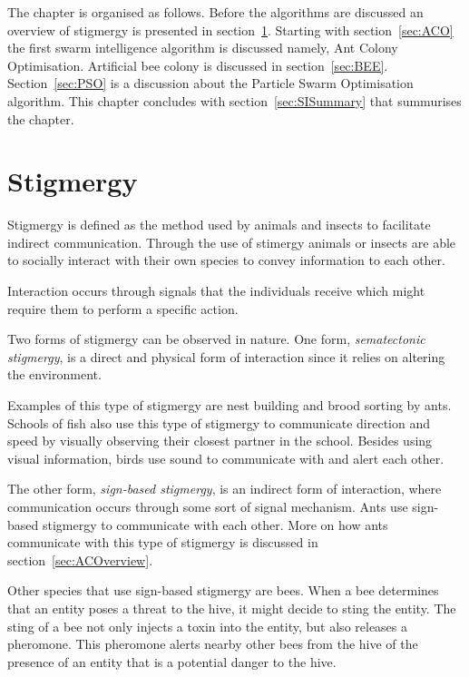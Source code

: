 The chapter is organised as follows. Before the algorithms are discussed an overview of stigmergy is presented in section~\ref{sec:stigmergy}. Starting with section~\ref{sec:ACO} the first swarm intelligence algorithm is discussed namely, Ant Colony Optimisation. Artificial bee colony is discussed in section~\ref{sec:BEE}. Section~\ref{sec:PSO} is a discussion about the Particle Swarm Optimisation algorithm. This chapter concludes with section~\ref{sec:SISummary} that summurises the chapter.

\section{Stigmergy}
\label{sec:stigmergy}
Stigmergy is defined as the method used by animals and insects to facilitate indirect communication\cite{AntsAndStigmergy,CompuIntelligenceIntro,AntIntroTrends,FundamentalSwarm}. Through the use of stimergy animals or insects are able to socially interact with their own species to convey information to each other\cite{AntsAndStigmergy,CompuIntelligenceIntro,AntIntroTrends,FundamentalSwarm}.

Interaction occurs through signals that the individuals receive which might require them to perform a specific action\cite{AntsAndStigmergy,CompuIntelligenceIntro,AntIntroTrends}.

Two forms of stigmergy can be observed in nature. One form, \emph{sematectonic stigmergy}\label{def:sematectonic}, is a direct and physical form of interaction since it relies on altering the environment\cite{CompuIntelligenceIntro}. 

Examples of this type of stigmergy are nest building and brood sorting by ants\cite{CompuIntelligenceIntro}. Schools of fish also use this type of stigmergy to communicate direction and speed by visually observing their closest partner in the school. Besides using visual information, birds use sound to communicate with and alert each other\cite{SwarmArt}.

The other form, \emph{sign-based stigmergy}, is an indirect form of interaction, where communication occurs through some sort of signal mechanism\cite{CompuIntelligenceIntro}. Ants use sign-based stigmergy to communicate with each other. More on how ants communicate with this type of stigmergy is discussed in section~\ref{sec:ACOverview}.

Other species that use sign-based stigmergy are bees\cite{stigmergicoptimization}. When a bee determines that an entity poses a threat to the hive, it might decide to sting the entity. The sting of a bee not only injects a toxin into the entity, but also releases a pheromone\cite{stigmergicoptimization}. This pheromone alerts nearby other bees from the hive of the presence of an entity that is a potential danger to the hive\cite{stigmergicoptimization}. 


